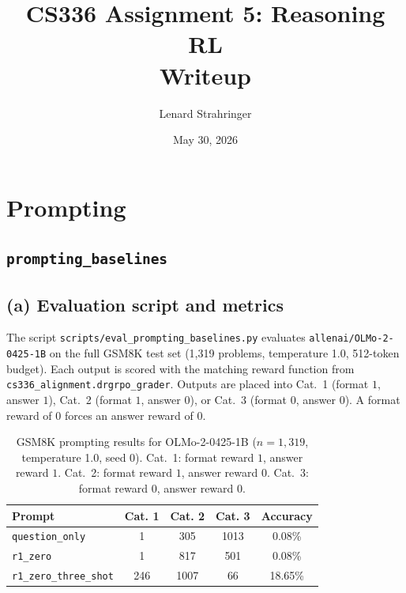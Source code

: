 \documentclass[11pt]{article}
\title{CS336 Assignment 5: Reasoning RL \\ \large Writeup}
\author{Lenard Strahringer}
\date{May 30, 2026}
\newcommand{\problemid}[1]{\subsection*{\nolinkurl{#1}}}
\begin{document}
\maketitle

\tableofcontents
\newpage

\section{Prompting}

\problemid{prompting_baselines}

\subsection*{(a) Evaluation script and metrics}

The script \texttt{scripts/eval\_prompting\_baselines.py} evaluates
\texttt{allenai/OLMo-2-0425-1B} on the full GSM8K test set (1{,}319 problems,
temperature 1.0, 512-token budget). Each output is scored with the matching
reward function from \texttt{cs336\_alignment.drgrpo\_grader}. Outputs are
placed into Cat.~1 (format $1$, answer $1$), Cat.~2 (format $1$, answer $0$),
or Cat.~3 (format $0$, answer $0$). A format reward of $0$ forces an answer
reward of $0$.

\begin{table}[H]
\centering
\begin{tabular}{lcccc}
\toprule
Prompt & Cat. 1 & Cat. 2 & Cat. 3 & Accuracy \\
\midrule
\texttt{question\_only}        & 1   & 305 & 1013 & 0.08\% \\
\texttt{r1\_zero}              & 1   & 817 &  501 & 0.08\% \\
\texttt{r1\_zero\_three\_shot} & 246 & 1007 &  66 & 18.65\% \\
\bottomrule
\end{tabular}
\caption{GSM8K prompting results for OLMo-2-0425-1B ($n=1{,}319$, temperature 1.0, seed 0).
Cat.~1: format reward $1$, answer reward $1$. Cat.~2: format reward $1$, answer reward $0$.
Cat.~3: format reward $0$, answer reward $0$.}
\end{table}
\end{document}
